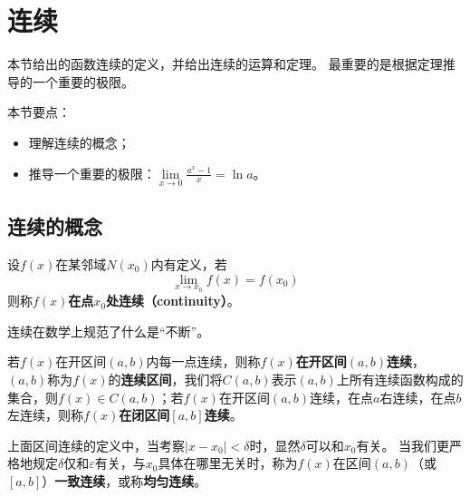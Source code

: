 \section{连续}

本节给出的函数连续的定义，并给出连续的运算和定理。
最重要的是根据定理推导的一个重要的极限。

本节要点：
\begin{itemize}
    \item 理解连续的概念；
    \item 推导一个重要的极限：$\underset{x\rightarrow 0}{\lim}\frac{a^x-1}{x}=\ln a$。
\end{itemize}

\subsection{连续的概念}

\begin{definition}[连续]
设$f\left( x \right) $在某邻域$N\left( x_0 \right) $内有定义，若
\[
\underset{x\rightarrow x_0}{\lim}f\left( x \right) =f\left( x_0 \right)
\]
则称{\bf $f\left( x \right) $在点$x_0$处连续（continuity）}。
\end{definition}

连续在数学上规范了什么是“不断”。

\begin{definition}[区间连续]
若$f\left( x \right) $在开区间$\left( a,b \right) $内每一点连续，则称{\bf $f\left( x \right) $在开区间$\left( a,b \right) $连续}，$\left( a,b \right) $称为$f\left( x \right) $的{\bf 连续区间}，我们将$C\left( a,b \right) $表示$\left( a,b \right) $上所有连续函数构成的集合，则$f\left( x \right) \in C\left( a,b \right) $；若$f\left( x \right) $在开区间$\left( a,b \right) $连续，在点$a$右连续，在点$b$左连续，则称{\bf $f\left( x \right) $在闭区间$\left[ a,b \right] $连续}。
\end{definition}

\begin{definition}[一致连续性]
上面区间连续的定义中，当考察$\left| x-x_0 \right|<\delta $时，显然$\delta $可以和$x_0$有关。
当我们更严格地规定$\delta $仅和$\varepsilon $有关，与$x_0$具体在哪里无关时，称为$f\left( x \right) $在区间$\left( a,b \right) $（或$\left[ a,b \right] $）{\bf 一致连续}，或称{\bf 均匀连续}。
\end{definition}

